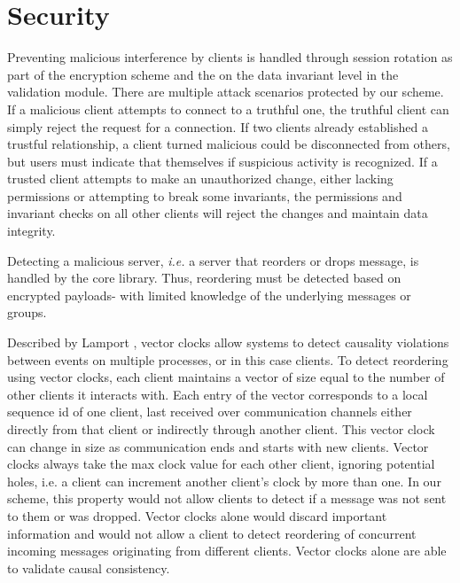 \section{Security}
Preventing malicious interference by clients is handled through session rotation as part of the encryption scheme and the on the data invariant level in the validation module. There are multiple attack scenarios protected by our scheme. If a malicious client attempts to connect to a truthful one, the truthful client can simply reject the request for a connection. If two clients already established a trustful relationship, a client turned malicious could be disconnected from others, but users must indicate that themselves if suspicious activity is recognized. If a trusted client attempts to make an unauthorized change, either lacking permissions or attempting to break some invariants, the permissions and invariant checks on all other clients will reject the changes and maintain data integrity.

Detecting a malicious server, \textit{i.e.} a server that reorders or drops message, is handled by the core library. Thus, reordering must be detected based on encrypted payloads- with limited knowledge of the underlying messages or groups.

\noindent 
{}

 Described by Lamport , vector clocks allow systems to detect causality violations between events on multiple processes, or in this case clients. 
To detect reordering using vector clocks, each client maintains a vector of size equal to the number of other clients it interacts with. Each entry of the vector corresponds to a local sequence id of one client, last received over communication channels either directly from that client or indirectly through another client. This vector clock can change in size as communication ends and starts with new clients. Vector clocks always take the max clock value for each other client, ignoring potential holes, i.e. a client can increment another client's clock by more than one. In our scheme, this property would not allow clients to detect if a message was not sent to them or was dropped. Vector clocks alone would discard important information and would not allow a client to detect reordering of concurrent incoming messages originating from different clients. Vector clocks alone are able to validate causal consistency.

